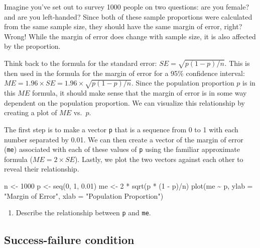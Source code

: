 \documentclass[
]{article}
\newenvironment{Shaded}{\begin{snugshade}}{\end{snugshade}}
\newcommand{\AttributeTok}[1]{\textcolor[rgb]{0.77,0.63,0.00}{#1}}
\newcommand{\DecValTok}[1]{\textcolor[rgb]{0.00,0.00,0.81}{#1}}
\newcommand{\FloatTok}[1]{\textcolor[rgb]{0.00,0.00,0.81}{#1}}
\newcommand{\FunctionTok}[1]{\textcolor[rgb]{0.00,0.00,0.00}{#1}}
\newcommand{\NormalTok}[1]{#1}
\newcommand{\OtherTok}[1]{\textcolor[rgb]{0.56,0.35,0.01}{#1}}
\newcommand{\SpecialCharTok}[1]{\textcolor[rgb]{0.00,0.00,0.00}{#1}}
\newcommand{\StringTok}[1]{\textcolor[rgb]{0.31,0.60,0.02}{#1}}
\providecommand{\tightlist}{%
  \setlength{\itemsep}{0pt}\setlength{\parskip}{0pt}}
\begin{document}
Imagine you've set out to survey 1000 people on two questions: are you
female? and are you left-handed? Since both of these sample proportions
were calculated from the same sample size, they should have the same
margin of error, right? Wrong! While the margin of error does change
with sample size, it is also affected by the proportion.

Think back to the formula for the standard error:
\(SE = \sqrt{p(1-p)/n}\). This is then used in the formula for the
margin of error for a 95\% confidence interval:
\(ME = 1.96\times SE = 1.96\times\sqrt{p(1-p)/n}\). Since the population
proportion \(p\) is in this \(ME\) formula, it should make sense that
the margin of error is in some way dependent on the population
proportion. We can visualize this relationship by creating a plot of
\(ME\) vs.~\(p\).

The first step is to make a vector \texttt{p} that is a sequence from 0
to 1 with each number separated by 0.01. We can then create a vector of
the margin of error (\texttt{me}) associated with each of these values
of \texttt{p} using the familiar approximate formula
(\(ME = 2 \times SE\)). Lastly, we plot the two vectors against each
other to reveal their relationship.

\begin{Shaded}
\begin{Highlighting}[]
\NormalTok{n }\OtherTok{\textless{}{-}} \DecValTok{1000}
\NormalTok{p }\OtherTok{\textless{}{-}} \FunctionTok{seq}\NormalTok{(}\DecValTok{0}\NormalTok{, }\DecValTok{1}\NormalTok{, }\FloatTok{0.01}\NormalTok{)}
\NormalTok{me }\OtherTok{\textless{}{-}} \DecValTok{2} \SpecialCharTok{*} \FunctionTok{sqrt}\NormalTok{(p }\SpecialCharTok{*}\NormalTok{ (}\DecValTok{1} \SpecialCharTok{{-}}\NormalTok{ p)}\SpecialCharTok{/}\NormalTok{n)}
\FunctionTok{plot}\NormalTok{(me }\SpecialCharTok{\textasciitilde{}}\NormalTok{ p, }\AttributeTok{ylab =} \StringTok{"Margin of Error"}\NormalTok{, }\AttributeTok{xlab =} \StringTok{"Population Proportion"}\NormalTok{)}
\end{Highlighting}
\end{Shaded}

\begin{enumerate}
\def\labelenumi{\arabic{enumi}.}
\setcounter{enumi}{7}
\tightlist
\item
  Describe the relationship between \texttt{p} and \texttt{me}.
\end{enumerate}

\hypertarget{success-failure-condition}{%
\subsection{Success-failure condition}\label{success-failure-condition}}
\end{document}
